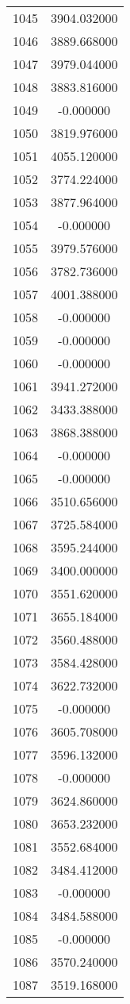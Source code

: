 \documentclass[12pt]{article}
\begin{document}
\begin{longtable}{@{}cc@{}}
1045 & 3904.032000 \\
1046 & 3889.668000 \\
1047 & 3979.044000 \\
1048 & 3883.816000 \\
1049 & -0.000000 \\
1050 & 3819.976000 \\
1051 & 4055.120000 \\
1052 & 3774.224000 \\
1053 & 3877.964000 \\
1054 & -0.000000 \\
1055 & 3979.576000 \\
1056 & 3782.736000 \\
1057 & 4001.388000 \\
1058 & -0.000000 \\
1059 & -0.000000 \\
1060 & -0.000000 \\
1061 & 3941.272000 \\
1062 & 3433.388000 \\
1063 & 3868.388000 \\
1064 & -0.000000 \\
1065 & -0.000000 \\
1066 & 3510.656000 \\
1067 & 3725.584000 \\
1068 & 3595.244000 \\
1069 & 3400.000000 \\
1070 & 3551.620000 \\
1071 & 3655.184000 \\
1072 & 3560.488000 \\
1073 & 3584.428000 \\
1074 & 3622.732000 \\
1075 & -0.000000 \\
1076 & 3605.708000 \\
1077 & 3596.132000 \\
1078 & -0.000000 \\
1079 & 3624.860000 \\
1080 & 3653.232000 \\
1081 & 3552.684000 \\
1082 & 3484.412000 \\
1083 & -0.000000 \\
1084 & 3484.588000 \\
1085 & -0.000000 \\
1086 & 3570.240000 \\
1087 & 3519.168000 \\

\end{longtable}
\end{document}

